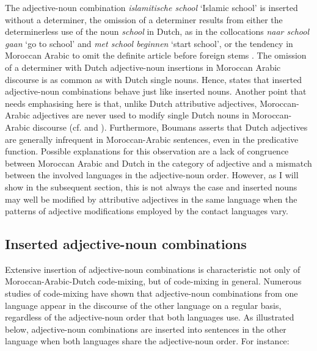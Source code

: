 \noindent The adjective-noun combination \textit{islamitische school} `Islamic school' is inserted without a determiner, the omission of a determiner results from either the determinerless use of the noun \textit{school} in Dutch, as in the collocations \textit{naar school gaan} `go to school' and \textit{met school beginnen} `start school', or the tendency in Moroccan Arabic to omit the definite article before foreign stems \citep[cf.][187]{boumans-syntax-1998}. The omission of a determiner with Dutch adjective-noun insertions in Moroccan Arabic discourse is as common as with Dutch single nouns. Hence, \citet[205]{boumans-syntax-1998} states that inserted adjective-noun combinations behave just like inserted nouns. Another point that needs emphasising here is that, unlike Dutch attributive adjectives, Moroccan-Arabic adjectives are never used to modify single Dutch nouns in Moroccan-Arabic discourse (cf.  and \citealt[][201]{boumans-syntax-1998}). Furthermore, Boumans asserts that Dutch adjectives are generally infrequent in Moroccan-Arabic sentences, even in the predicative function. Possible explanations for this observation are a lack of congruence between Moroccan Arabic and Dutch in the category of adjective and a mismatch between the involved languages in the adjective-noun order. However, as I will show in the subsequent section, this is not always the case and inserted nouns may well be modified by attributive adjectives in the same language when the patterns of adjective modifications employed by the contact languages vary.

\subsection{Inserted adjective-noun combinations}
Extensive insertion of adjective-noun combinations is characteristic not only of Moroccan-Arabic-Dutch code-mixing, but of code-mixing in general. Numerous studies of code-mixing have shown that adjective-noun combinations from one language appear in the discourse of the other language on a regular basis, regardless of the adjective-noun order that both languages use. As illustrated below, adjective-noun combinations are inserted into sentences in the other language when both languages share the adjective-noun order. For instance:

